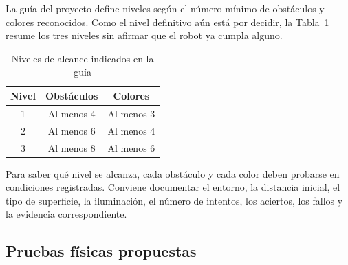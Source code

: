 \documentclass[journal]{IEEEtran}
\begin{document}
La guía del proyecto define niveles según el número mínimo de obstáculos y colores reconocidos. Como el nivel definitivo aún está por decidir, la Tabla~\ref{tab:niveles} resume los tres niveles sin afirmar que el robot ya cumpla alguno.

\begin{table}[H]
\centering
\caption{Niveles de alcance indicados en la guía}
\label{tab:niveles}
\scriptsize
\begin{tabular}{c c c}
\toprule
\textbf{Nivel} & \textbf{Obstáculos} & \textbf{Colores} \\
\midrule
1 & Al menos 4 & Al menos 3 \\
2 & Al menos 6 & Al menos 4 \\
3 & Al menos 8 & Al menos 6 \\
\bottomrule
\end{tabular}
\end{table}

Para saber qué nivel se alcanza, cada obstáculo y cada color deben probarse en condiciones registradas. Conviene documentar el entorno, la distancia inicial, el tipo de superficie, la iluminación, el número de intentos, los aciertos, los fallos y la evidencia correspondiente.

\subsection{Pruebas físicas propuestas}
\end{document}
